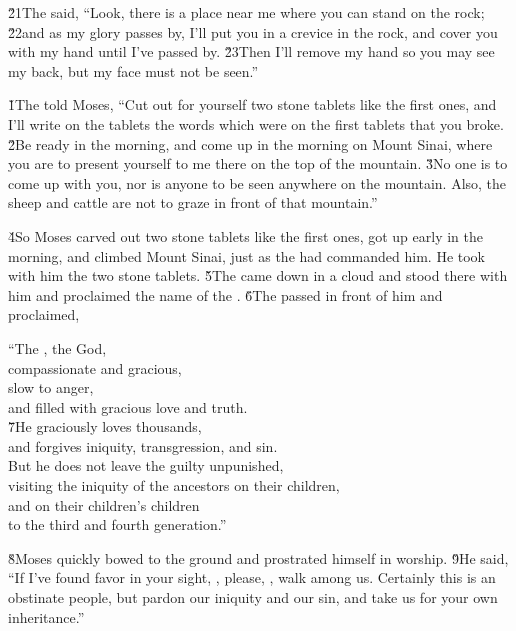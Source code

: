 \v{21}The  said, ``Look, there is a place near me where you can stand on the rock; \v{22}and as my glory passes by, I'll put you in a crevice in the rock, and cover you with my hand until I've passed by. \v{23}Then I'll remove my hand so you may see my back, but my face must not be seen.''

\v{1}The  told Moses, ``Cut out for yourself two stone tablets like the first ones, and I'll write on the tablets the words which were on the first tablets that you broke. \v{2}Be ready in the morning, and come up in the morning on Mount Sinai, where you are to present yourself to me there on the top of the mountain. \v{3}No one is to come up with you, nor is anyone to be seen anywhere on the mountain. Also, the sheep and cattle are not to graze in front of that mountain.''

\v{4}So Moses carved out two stone tablets like the first ones, got up early in the morning, and climbed Mount Sinai, just as the  had commanded him. He took with him the two stone tablets. \v{5}The  came down in a cloud and stood there with him and proclaimed the name of the . \v{6}The  passed in front of him and proclaimed,

\begin{poetry}
\poeml ``The , the  God, \\
\poemll    compassionate and gracious, \\
\poeml slow to anger, \\
\poemll    and filled with gracious love and truth. \\
\poeml \v{7}He graciously loves thousands, \\
\poemll    and forgives iniquity, transgression, and sin. \\
\poeml But he does not leave the guilty unpunished, \\
\poemll    visiting the iniquity of the ancestors on their children, \\
\poeml and on their children's children \\
\poemll    to the third and fourth generation.''
\end{poetry}

\v{8}Moses quickly bowed to the ground and prostrated himself in worship. \v{9}He said, ``If I've found favor in your sight, , please, , walk among us. Certainly this is an obstinate people, but pardon our iniquity and our sin, and take us for your own inheritance.''

